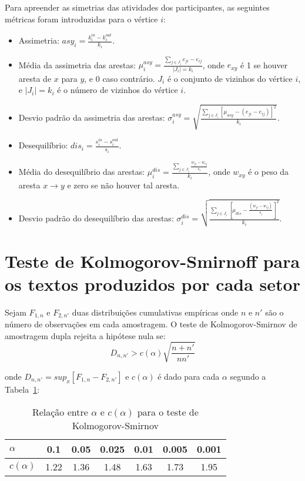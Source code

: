 \documentclass[a4paper,openright,12pt]{report} %
\begin{document}
Para apreender as simetrias das atividades dos participantes, as
seguintes métricas foram introduzidas para o vértice $i$:

\begin{itemize}
	\item Assimetria: $asy_i=\frac{k_i^{in}-k_i^{out}}{k_i}$.
	\item Média da assimetria das arestas: $\mu_i^{asy}=\frac{\sum_{j\in J_i} e_{ji}-e_{ij}}{|J_i|=k_i}$, onde $e_{xy}$ é 1 se houver aresta de $x$ para $y$, e $0$ caso contrário. $J_i$ é o conjunto de vizinhos do vértice $i$, e $|J_i|=k_i$ é o número de vizinhos do vértice $i$.
	\item Desvio padrão da assimetria das arestas: $\sigma_i^{asy}=\sqrt{\frac{\sum_{j\in J_i}[\mu_{asy} -(e_{ji}-e_{ij}) ]^2  }{k_i}  }$.
	\item Desequilíbrio: $dis_i=\frac{s_i^{in}-s_i^{out}}{s_i}$.
	\item Média do desequilíbrio das arestas: $\mu_i^{dis}=\frac{\sum_{j \in J_i}\frac{w_{ji}-w_{ij}}{s_i}}{k_i}$, onde $w_{xy}$ é o peso da aresta $x\rightarrow y$ e zero se não houver tal aresta.
	\item Desvio padrão do desequilíbrio das arestas: $\sigma_i^{dis}=\sqrt{\frac{\sum_{j\in J_i}[\mu_{dis}-\frac{(w_{ji}-w_{ij})}{s_i}]^2}{k_i}}$.
\end{itemize}

\section{Teste de Kolmogorov-Smirnoff para os textos produzidos por cada setor}

Sejam $F_{1,n}$ e $F_{2,n'}$ duas distribuições cumulativas empíricas onde $n$ e $n'$ são o número de observações em cada amostragem.
O teste de Kolmogorov-Smirnov de amostragem dupla 
rejeita a hipótese nula se:
\begin{equation}\label{eq:ks}
D_{n,n'} > c(\alpha)\sqrt{\frac{n+n'}{nn'}}
\end{equation}

onde $D_{n,n'}=sup_x[F_{1,n}-F_{2,n'}]$ e $c(\alpha)$ é dado para cada $\alpha$ segundo a Tabela~\ref{tab:kol}:

\begin{table}[!h]
\centering
\caption{Relação entre $\alpha$ e $c(\alpha)$ para o teste de Kolmogorov-Smirnov}\label{tab:kol}
\begin{tabular}{|l||c|c|c|c|c|c|}\hline
$\alpha$    & 0.1  & 0.05 & 0.025 & 0.01 & 0.005 & 0.001 \\\hline
$c(\alpha)$ & 1.22 & 1.36 & 1.48  & 1.63 & 1.73  & 1.95  \\\hline
\end{tabular}
\end{table}
\end{document}
